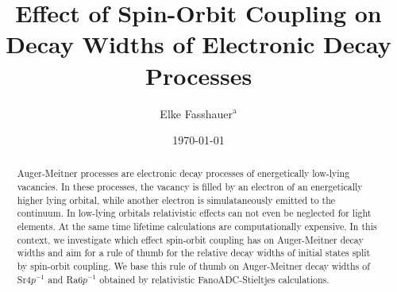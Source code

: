 \documentclass[aps,amssymb,preprint,a4paper,longbibliography]{revtex4}
\begin{document}
\newcommand{\wignerj}[6]{\mbox{$\left( \begin{array}{ccc} #1 & #2 & #3 \\ #4 & #5 & #6 \end{array} \right)$}}
\newcommand{\redume}[3]{\mbox{$( #1 || #2 || #3 )$}}

\setlength{\tabcolsep}{12pt}


\title{Effect of Spin-Orbit Coupling on Decay Widths of Electronic Decay Processes}

\author{Elke Fasshauer$^{\text{a}}$}



\date{\today}

%
\begin{abstract}
Auger-Meitner processes are electronic decay processes of energetically low-lying
vacancies. In these processes, the vacancy is filled by an electron of
an energetically higher lying orbital, while another electron is simulataneously
emitted to the continuum.
In low-lying orbitals relativistic effects can not even be neglected for light
elements. At the same time lifetime calculations are computationally expensive.
In this context, we investigate which effect spin-orbit coupling has on
Auger-Meitner
decay widths and aim for a rule of thumb for the relative decay widths of
initial states split by spin-orbit coupling.
We base this rule of thumb on Auger-Meitner decay widths
of Sr$4p^{-1}$ and Ra$6p^{-1}$
obtained by relativistic FanoADC-Stieltjes calculations.
\end{abstract}

\maketitle


%
\end{document}
